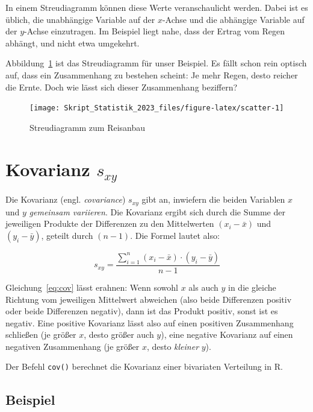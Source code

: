 \documentclass[
  11pt,
  ngerman,
  a4paper,
]{report}
\newenvironment{rtip}{
  \medskip
  \begin{tcolorbox}[colframe=purple,colback=light_gray,title=Softwarehinweis]
}{
  \end{tcolorbox}
  \medskip
}
\begin{document}
In einem Streudiagramm können diese Werte veranschaulicht werden. Dabei ist es üblich, die unabhängige Variable auf der \(x\)-Achse und die abhängige Variable auf der \(y\)-Achse einzutragen. Im Beispiel liegt nahe, dass der Ertrag vom Regen abhängt, und nicht etwa umgekehrt.

Abbildung~\ref{fig:scatter} ist das Streudiagramm für unser Beispiel. Es fällt schon rein optisch auf, dass ein Zusammenhang zu bestehen scheint: Je mehr Regen, desto reicher die Ernte. Doch wie lässt sich dieser Zusammenhang beziffern?

\begin{figure}[!h]

{\centering \texttt{[image: Skript\_Statistik\_2023\_files/figure-latex/scatter-1]} 

}

\caption{Streudiagramm zum Reisanbau}\label{fig:scatter}
\end{figure}

\hypertarget{kovarianz}{%
\section{\texorpdfstring{Kovarianz \(s_{xy}\)}{Kovarianz s\_\{xy\}}}\label{kovarianz}}

Die Kovarianz (engl. \emph{covariance}) \(s_{xy}\) gibt an, inwiefern die beiden Variablen \(x\) und \(y\) \emph{gemeinsam variieren}. Die Kovarianz ergibt sich durch die Summe der jeweiligen Produkte der Differenzen zu den Mittelwerten \((x_i-\bar{x})\) und \((y_i-\bar{y})\), geteilt durch \((n-1)\). Die Formel lautet also:

\[
s_{xy}=\frac{\sum\limits^n_{i=1}(x_i-\bar{x})\cdot(y_i-\bar{y})}{n-1}
\label{eq:cov}
\]

Gleichung~\eqref{eq:cov} lässt erahnen: Wenn sowohl \(x\) als auch \(y\) in die gleiche Richtung vom jeweiligen Mittelwert abweichen (also beide Differenzen positiv oder beide Differenzen negativ), dann ist das Produkt positiv, sonst ist es negativ. Eine positive Kovarianz lässt also auf einen positiven Zusammenhang schließen (je größer \(x\), desto größer auch \(y\)), eine negative Kovarianz auf einen negativen Zusammenhang (je größer \(x\), desto \emph{kleiner} \(y\)).

\begin{rtip}
Der Befehl \verb|cov()| berechnet die Kovarianz einer bivariaten Verteilung in R.
\end{rtip}

\hypertarget{beispiel-24}{%
\subsection{Beispiel}\label{beispiel-24}}
\end{document}
